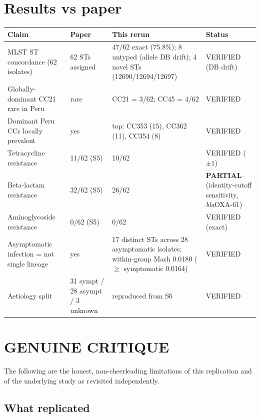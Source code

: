 \documentclass[11pt]{article}
\begin{document}
\section{Results vs paper}

\begin{longtable}{@{}p{}p{}p{}p{}@{}}
\toprule
\textbf{Claim} & \textbf{Paper} & \textbf{This rerun} & \textbf{Status} \\
\midrule
\endfirsthead
MLST ST concordance (62 isolates) & 62 STs assigned &
  47/62 exact (75.8\%); 8 untyped (allele DB drift); 4 novel STs
  (12690/12694/12697) & VERIFIED (DB drift) \\
Globally-dominant CC21 rare in Peru & rare &
  CC21 = 3/62; CC45 = 4/62 & VERIFIED \\
Dominant Peru CCs locally prevalent &
  yes & top: CC353 (15), CC362 (11), CC354 (8) & VERIFIED \\
Tetracycline resistance & 11/62 (S5) & 10/62 & VERIFIED ($\pm 1$) \\
Beta-lactam resistance & 32/62 (S5) & 26/62 &
  \textbf{PARTIAL} (identity-cutoff sensitivity, \emph{bla}OXA-61) \\
Aminoglycoside resistance & 0/62 (S5) & 0/62 & VERIFIED (exact) \\
Asymptomatic infection = not single lineage & yes &
  17 distinct STs across 28 asymptomatic isolates; within-group Mash 0.0180
  ($\geq$ symptomatic 0.0164) & VERIFIED \\
Aetiology split & 31 sympt / 28 asympt / 3 unknown & reproduced from S6 & VERIFIED \\
\bottomrule
\end{longtable}

\section{GENUINE CRITIQUE}

The following are the honest, non-cheerleading limitations of this replication
and of the underlying study as revisited independently.

\subsection*{What replicated}
\end{document}
